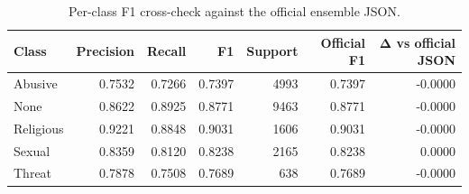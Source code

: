 \begin{table}
\caption{Per-class F1 cross-check against the official ensemble JSON.}
\label{tab:per_class_f1_crosscheck}
\begin{tabular}{lrrrrrr}
\toprule
Class & Precision & Recall & F1 & Support & Official F1 & Δ vs official JSON \\
\midrule
Abusive & 0.7532 & 0.7266 & 0.7397 & 4993 & 0.7397 & -0.0000 \\
None & 0.8622 & 0.8925 & 0.8771 & 9463 & 0.8771 & -0.0000 \\
Religious & 0.9221 & 0.8848 & 0.9031 & 1606 & 0.9031 & -0.0000 \\
Sexual & 0.8359 & 0.8120 & 0.8238 & 2165 & 0.8238 & 0.0000 \\
Threat & 0.7878 & 0.7508 & 0.7689 & 638 & 0.7689 & -0.0000 \\
\bottomrule
\end{tabular}
\end{table}
